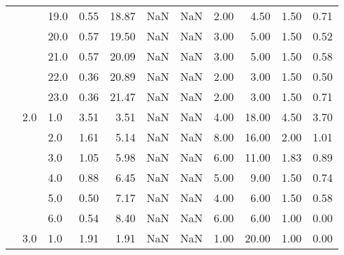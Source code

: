 \begin{tabular}{lllrrrrrrrr}
     &     & 19.0 &      0.55 &      18.87 &               NaN &                NaN & 2.00 &   4.50 &             1.50 &                         0.71 \\
     &     & 20.0 &      0.57 &      19.50 &               NaN &                NaN & 3.00 &   5.00 &             1.50 &                         0.52 \\
     &     & 21.0 &      0.57 &      20.09 &               NaN &                NaN & 3.00 &   5.00 &             1.50 &                         0.58 \\
     &     & 22.0 &      0.36 &      20.89 &               NaN &                NaN & 2.00 &   3.00 &             1.50 &                         0.50 \\
     &     & 23.0 &      0.36 &      21.47 &               NaN &                NaN & 2.00 &   3.00 &             1.50 &                         0.71 \\
     & 2.0 & 1.0  &      3.51 &       3.51 &               NaN &                NaN & 4.00 &  18.00 &             4.50 &                         3.70 \\
     &     & 2.0  &      1.61 &       5.14 &               NaN &                NaN & 8.00 &  16.00 &             2.00 &                         1.01 \\
     &     & 3.0  &      1.05 &       5.98 &               NaN &                NaN & 6.00 &  11.00 &             1.83 &                         0.89 \\
     &     & 4.0  &      0.88 &       6.45 &               NaN &                NaN & 5.00 &   9.00 &             1.50 &                         0.74 \\
     &     & 5.0  &      0.50 &       7.17 &               NaN &                NaN & 4.00 &   6.00 &             1.50 &                         0.58 \\
     &     & 6.0  &      0.54 &       8.40 &               NaN &                NaN & 6.00 &   6.00 &             1.00 &                         0.00 \\
     & 3.0 & 1.0  &      1.91 &       1.91 &               NaN &                NaN & 1.00 &  20.00 &             1.00 &                         0.00 \\
\bottomrule
\end{tabular}
